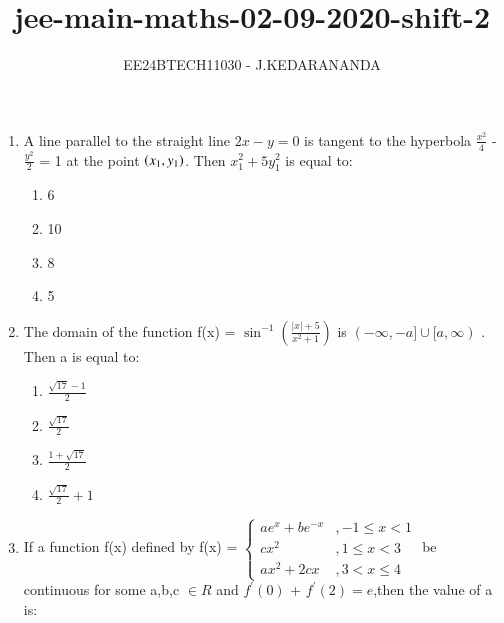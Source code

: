 \documentclass[journal]{IEEEtran}
\renewcommand{\thefigure}{\theenumi}
\renewcommand{\thetable}{\theenumi}
\numberwithin{equation}{enumi}
\numberwithin{figure}{enumi}
\renewcommand{\thetable}{\theenumi}
\begin{document}

\vspace{3cm}

\title{jee-main-maths-02-09-2020-shift-2}
\author{EE24BTECH11030 - J.KEDARANANDA}
{\let\newpage\relax\maketitle}
\renewcommand{\thefigure}{\theenumi}
\renewcommand{\thetable}{\theenumi}
\begin{enumerate}
    \item A line parallel to the straight line $2x-y=0$ is tangent to the hyperbola $\frac{x^2}{4}$ - $\frac{y^2}{2}$ = 1 at the point $\left(x_1,y_1\right)$. Then $x_1^2 + 5y_1^2$ is equal to: \\ 
    \begin{multicols}{4}
    \begin{enumerate}
        \item 6
        \item 10
        \item 8
        \item 5
    \end{enumerate}
    \end{multicols}
    \item The domain of the function f(x) = $\sin^{-1}\left(\frac{|x| + 5}{x^2 + 1}\right)$ is $(-\infty,-a]\cup[a,\infty)$ . Then a is equal to: \\
    \begin{multicols}{4}
    \begin{enumerate}
        \item $\frac{\sqrt{17}-1}{2}$
        \item $\frac{\sqrt{17}}{2}$
        \item $\frac{1 + \sqrt{17}}{2}$
        \item $\frac{\sqrt{17}}{2} + 1$
    \end{enumerate} 
    \end{multicols}
    \item If a function f(x) defined by f(x) = $\left\{\begin{array}{ll}ae^x + be^{-x}& ,  -1 \leq x < 1 \\cx^2 & ,  1 \leq x < 3 \\ax^2 + 2cx & ,  3 < x \leq 4\end{array}\right.$ be continuous for some a,b,c $\in R$ and $f^{\prime}(0)$ + $f^{\prime}(2) = e$,then the value of a is: \\

\end{enumerate}
\end{document}
